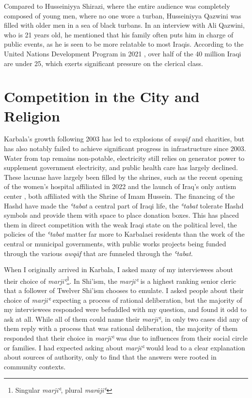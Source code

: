 Compared to Husseiniyya Shirazi, where the entire audience was completely composed of young men, where no one wore a turban, Husseiniyya Qazwini was filled with older men in a sea of black turbans. In an interview with Ali Qazwini, who is 21 years old, he mentioned that his family often puts him in charge of public events, as he is seen to be more relatable to most Iraqis. According to the United Nations Development Program in 2021 \cite{undp_youth_2021}, over half of the 40 million Iraqi are under 25, which exerts significant pressure on the clerical class. 

\section{Competition in the City and Religion}
Karbala's growth following 2003 has led to explosions of \emph{awqāf} and charities, but has also notably failed to achieve significant progress in infrastructure since 2003. Water from tap remains non-potable, electricity still relies on generator power to supplement government electricity, and public health care has largely declined. These lacunae have largely been filled by the shrines, such as the recent opening of the women's hospital affiliated in 2022 and the launch of Iraq's only autism center \cite{imam_hussain_holy_shrine_imam_2020}, both affiliated with the Shrine of Imam Hussein. The financing of the Hashd have made the \emph{ʿtabat} a central part of Iraqi life, the \emph{ʿtabat} tolerate Hashd symbols and provide them with space to place donation boxes. This has placed them in direct competition with the weak Iraqi state on the political level, the policies of the \emph{ʿtabat} matter far more to Karbalaei residents than the work of the central or municipal governments, with public works projects being funded through the various \emph{awqāf} that are funneled through the \emph{ʿtabat}. 

When I originally arrived in Karbala, I asked many of my interviewees about their choice of \emph{marjiʿ}\footnote{Singular \emph{marjiʿ}, plural \emph{marājiʿ}}. In Shi'ism, the \emph{marjiʿ} is a highest ranking senior cleric that a follower of Twelver Shi'ism chooses to emulate. I asked people about their choice of \emph{marjiʿ} expecting a process of rational deliberation, but the majority of my interviewees responded were befuddled with my question, and found it odd to ask at all. While all of them could name their \emph{marjiʿ}, in only two cases did any of them reply with a process that was rational deliberation, the majority of them responded that their choice in \emph{marjiʿ} was due to influences from their social circle or families. I had expected asking about \emph{marjiʿ} would lead to a clear explanation about sources of authority, only to find that the answers were rooted in community contexts.

